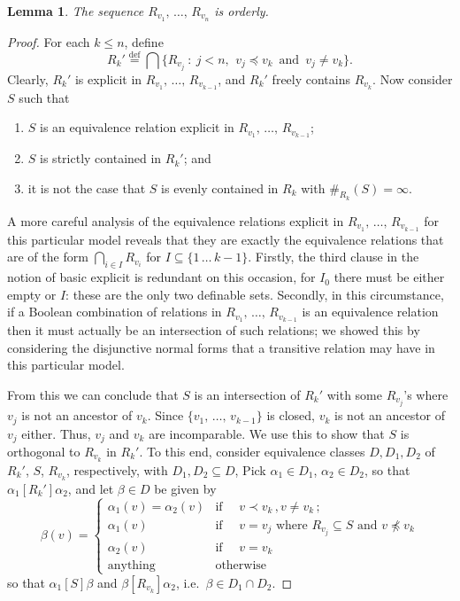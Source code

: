 \documentclass[10pt]{amsart}
\newtheorem{lemm}[theo]{Lemma}\newtheorem{prop}[theo]{Proposition}\newtheorem{coro}[theo]{Corollary}\newtheorem{conj}[theo]{Conjecture}
\theoremstyle{definition}\newtheorem{defi}[theo]{Definition}\newtheorem{rema}[theo]{Remark}\newtheorem{exam}[theo]{Example}\newtheorem{exem}[theo]{Example}\newtheorem{nota}[theo]{Notation}
\newcommand*{\defeq}{\stackrel{\mathrm{def}}{=}}
\begin{document}
\begin{lemm}\label{lem: orderly}
The sequence $R_{v_1},\,\ldots,\,R_{v_n}$ is orderly.
\end{lemm}
\begin{proof}
For each $k \leq n$, define
\[
R_k'
\defeq \bigcap \big\{ R_{v_j}~:~j<n,\ \, v_j \preceq v_k \,\mbox{ and }\,v_j \neq v_k \big\}.
\]
Clearly, $R_k'$ is explicit in $R_{v_1},\,\ldots,\,R_{v_{k-1}}$, and $R_k'$ freely contains $R_{v_k}$. Now consider $S$ such that
\begin{enumerate}
\item $S$ is an equivalence relation explicit in $R_{v_1},\,\ldots,\,R_{v_{k-1}}$;
\item $S$ is strictly contained in $R_k'$; and
\item it is not the case that $S$ is evenly contained in $R_k$ with $\#_{R_k}(S) = \infty$.
\end{enumerate}
A more careful analysis of the equivalence relations explicit in $R_{v_1},\,\ldots,\,R_{v_{k-1}}$ for this particular model reveals that they are exactly the equivalence relations that are of the form $\bigcap_{i\in I} R_{v_i}$ for ${I\subseteq \{1\,\dots\,k-1\}}$. Firstly, the third clause in the notion of basic explicit is redundant on this occasion, for $I_0$ there must be either empty or $I$: these are the only two definable sets. Secondly, in this circumstance, if a Boolean combination of relations in $R_{v_1},\,\ldots,\,R_{v_{k-1}}$ is an equivalence relation then it must actually be an intersection of such relations; we showed this by considering the disjunctive normal forms that a transitive relation may have in this particular model.

From this we can conclude that $S$ is an intersection of $R_k'$ with some $R_{v_j}$'s where $v_j$ is not an ancestor of $v_k$. Since $\{v_1,\,\ldots,\,v_{k-1}\}$ is closed, $v_k$ is not an ancestor of $v_j$ either. Thus, $v_j$ and $v_k$ are incomparable. We use this to show that $S$ is orthogonal to $R_{v_k}$ in $R_k'$. To this end, consider equivalence classes $D, D_1, D_2$ of $R_k'$, $S$, $R_{v_k}$, respectively, with $D_1, D_2 \subseteq D$, Pick $\alpha_1\in D_1$, $\alpha_2\in D_2$, so that $\alpha_1\mathrel{[R_k']}\alpha_2$, and let $\beta\in D$ be given by
\[
\beta(v)=
\begin{cases}
\alpha_1(v)=\alpha_2(v)&\text{if }\quad v\prec v_k\,, v\neq v_k\,;\\
\alpha_1(v)&\text{if }\quad v=v_j\text{ where }R_{v_j}\subseteq S\text{ and }v\not\preceq v_k\\
\alpha_2(v)&\text{if }\quad v=v_k\\
\text{anything}&\text{otherwise}
\end{cases}
\]
so that $\alpha_1\mathrel {[S]} \beta$ and $\beta\mathrel {[R_{v_k}]} \alpha_2$, i.e.~$\beta\in D_1\cap D_2$.
\end{proof}
\end{document}
